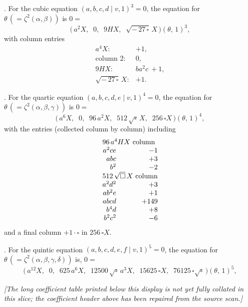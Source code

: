 \documentclass[11pt]{article}
\newcommand{\Cdel}{\mid}
\begin{document}
\medskip

. For the cubic equation $(a, b, c, d \Cdel v, 1)^3 = 0$, the equation for $\theta\,(=\zeta^2(\alpha, \beta))$ is $0 =$
\[
\bigl(\,a^2 X,\;\; 0,\;\; 9 H X,\;\; \sqrt{-\,27\,\square}\,X\,\bigr)(\theta,\,1)^3,
\]
with column entries
\[
\begin{array}{ll}
a^4 X:                     & +1,\\
\text{column }2:           & 0,\\
9 H X:                     & b a^2 c\ {+}1,\\
\sqrt{-\,27\,\square}\,X:  & +1.
\end{array}
\]

\medskip

. For the quartic equation $(a, b, c, d, e \Cdel v, 1)^4 = 0$, the equation for $\theta\,(=\zeta^2(\alpha, \beta, \gamma))$ is $0 =$
\[
\bigl(\,a^6 X,\;\; 0,\;\; 96\,a^2 X,\;\; 512\,\sqrt{\square}\,X,\;\; 256\,\square X\,\bigr)(\theta,\,1)^4,
\]
with the entries (collected column by column) including
\[
\begin{array}{rr}
\multicolumn{2}{l}{96\,a^4 H X\ \text{column}}\\
a^2 c e   & -1\\
a b c     & +3\\
b^2       & -2\\
\multicolumn{2}{l}{512\,\sqrt{\square}\,X\ \text{column}}\\
a^2 d^2   & +3\\
a b^2 e   & +1\\
a b c d   & +149\\
b^4 d     & +8\\
b^2 c^2   & -6\\
\end{array}
\]
and a final column $+1\cdot\square$ in $256\,\square X$.

\medskip

. For the quintic equation $(a, b, c, d, e, f \Cdel v, 1)^5 = 0$, the equation for $\theta\,(=\zeta^2(\alpha, \beta, \gamma, \delta))$ is, $0 =$
\[
\bigl(\,a^{12}X,\;\;0,\;\;625\,a^6X,\;\;12500\,\sqrt{\square}\,a^3X,\;\;15625\,\square X,\;\;76125\,\square\sqrt{\square}\,\bigr)(\theta,\,1)^5,
\]

\smallskip

\noindent\textit{[The long coefficient table printed below this display is not yet fully collated in this slice; the coefficient header above has been repaired from the source scan.]}
\end{document}
